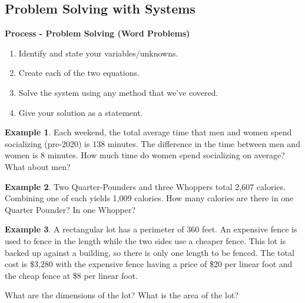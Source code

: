 \documentclass[addpoints,12pt]{exam}
\theoremstyle{definition}
\theoremstyle{break}
\theoremstyle{break}
\newtheorem{example}{Example}[subsection]
\begin{document}
\setcounter{section}{4}
\setcounter{subsection}{3}

\subsection{Problem Solving with Systems}

\vspace{.15in}

\begin{mdframed}
\textbf{Process - Problem Solving (Word Problems)}
\begin{enumerate}
\item Identify and state your variables/unknowns.
\item Create each of the two equations.
\item Solve the system using any method that we've covered.
\item Give your solution as a statement.
\end{enumerate}
\end{mdframed}

\vspace{.15in}

\begin{example}
Each weekend, the total average time that men and women spend socializing (pre-2020) is 138 minutes. The difference in the time between men and women is 8 minutes. How much time do women spend socializing on average? What about men?
\end{example}

\newpage

\begin{example}
Two Quarter-Pounders and three Whoppers total 2,607 calories. Combining one of each yields 1,009 calories. How many calories are there in one Quarter Pounder? In one Whopper?
\end{example}

\newpage

\begin{example}
A rectangular lot has a perimeter of 360 feet. An expensive fence is used to fence in the length while the two sides use a cheaper fence. This lot is backed up against a building, so there is only one length to be fenced. The total cost is \$3,280 with the expensive fence having a price of \$20 per linear foot and the cheap fence at \$8 per linear foot.

\vspace{.15in}

\noindent What are the dimensions of the lot? What is the area of the lot?
\end{example}
\end{document}
